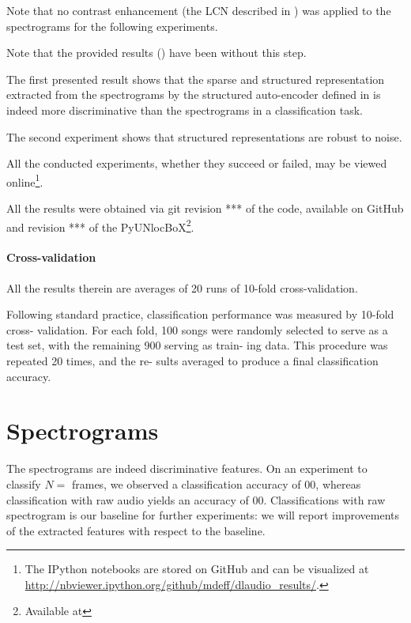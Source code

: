 Note that no contrast enhancement (the \gls{LCN} described in ) was applied to the spectrograms for the following experiments.

Note that the provided results () have been  without this step.

The first presented result shows that the sparse and structured representation extracted from the spectrograms by the structured auto-encoder defined in  is indeed more discriminative than the spectrograms in a classification task.

The second experiment shows that structured representations are robust to noise.

All the conducted experiments, whether they succeed or failed, may be viewed online\footnote{The IPython notebooks are stored on GitHub and can be visualized at \url{http://nbviewer.ipython.org/github/mdeff/dlaudio_results/}.}.

All the results were obtained via git revision *** of the code, available on GitHub and revision *** of the PyUNlocBoX\footnote{Available at}.


\paragraph{Cross-validation}
All the results therein are averages of 20 runs of 10-fold cross-validation.

Following standard practice,
classification performance was measured by 10-fold cross-
validation. For each fold, 100 songs were randomly selected
to serve as a test set, with the remaining 900 serving as train-
ing data. This procedure was repeated 20 times, and the re-
sults averaged to produce a final classification accuracy.

\section{Spectrograms} \label{sec:spectrograms}

The spectrograms are indeed discriminative features. On an experiment to classify $N = $ frames, we observed a classification accuracy of $00$, whereas classification with raw audio yields an accuracy of $00$. Classifications with raw spectrogram is our baseline for further experiments: we will report improvements of the extracted features with respect to the baseline.


